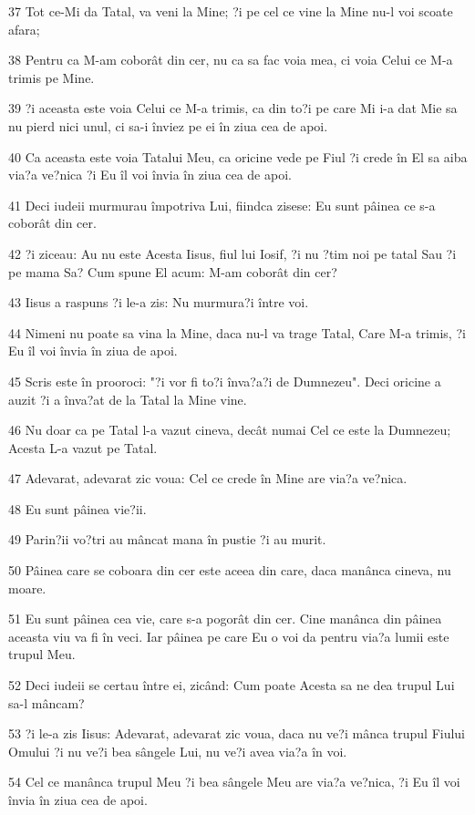 \par 37 Tot ce-Mi da Tatal, va veni la Mine; ?i pe cel ce vine la Mine nu-l voi scoate afara;
\par 38 Pentru ca M-am coborât din cer, nu ca sa fac voia mea, ci voia Celui ce M-a trimis pe Mine.
\par 39 ?i aceasta este voia Celui ce M-a trimis, ca din to?i pe care Mi i-a dat Mie sa nu pierd nici unul, ci sa-i înviez pe ei în ziua cea de apoi.
\par 40 Ca aceasta este voia Tatalui Meu, ca oricine vede pe Fiul ?i crede în El sa aiba via?a ve?nica ?i Eu îl voi învia în ziua cea de apoi.
\par 41 Deci iudeii murmurau împotriva Lui, fiindca zisese: Eu sunt pâinea ce s-a coborât din cer.
\par 42 ?i ziceau: Au nu este Acesta Iisus, fiul lui Iosif, ?i nu ?tim noi pe tatal Sau ?i pe mama Sa? Cum spune El acum: M-am coborât din cer?
\par 43 Iisus a raspuns ?i le-a zis: Nu murmura?i între voi.
\par 44 Nimeni nu poate sa vina la Mine, daca nu-l va trage Tatal, Care M-a trimis, ?i Eu îl voi învia în ziua de apoi.
\par 45 Scris este în prooroci: "?i vor fi to?i înva?a?i de Dumnezeu". Deci oricine a auzit ?i a înva?at de la Tatal la Mine vine.
\par 46 Nu doar ca pe Tatal l-a vazut cineva, decât numai Cel ce este la Dumnezeu; Acesta L-a vazut pe Tatal.
\par 47 Adevarat, adevarat zic voua: Cel ce crede în Mine are via?a ve?nica.
\par 48 Eu sunt pâinea vie?ii.
\par 49 Parin?ii vo?tri au mâncat mana în pustie ?i au murit.
\par 50 Pâinea care se coboara din cer este aceea din care, daca manânca cineva, nu moare.
\par 51 Eu sunt pâinea cea vie, care s-a pogorât din cer. Cine manânca din pâinea aceasta viu va fi în veci. Iar pâinea pe care Eu o voi da pentru via?a lumii este trupul Meu.
\par 52 Deci iudeii se certau între ei, zicând: Cum poate Acesta sa ne dea trupul Lui sa-l mâncam?
\par 53 ?i le-a zis Iisus: Adevarat, adevarat zic voua, daca nu ve?i mânca trupul Fiului Omului ?i nu ve?i bea sângele Lui, nu ve?i avea via?a în voi.
\par 54 Cel ce manânca trupul Meu ?i bea sângele Meu are via?a ve?nica, ?i Eu îl voi învia în ziua cea de apoi.
